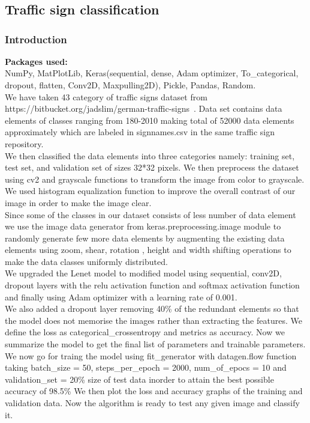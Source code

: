 \chapter{}
\section{{Traffic sign classification}}
\subsection{Introduction}
{\textbf{Packages used:}}\\
NumPy, MatPlotLib, Keras(sequential, dense, Adam optimizer, To\_categorical,\\ dropout, flatten, Conv2D, Maxpulling2D), Pickle, Pandas, Random.\\

We have  taken 43 category of traffic signs dataset from https://bitbucket.org/jadslim/german-traffic-signs~\cite{6033395}. Data set contains data elements of classes ranging from 180-2010 making total of 52000 data elements approximately which are labeled in signnames.csv in the same traffic sign repository.\\
We then classified the data elements into three categories namely: training set, test set, and validation set of sizes 32*32 pixels.
We then preprocess the dataset using  cv2 and grayscale functions to transform the image from color to grayscale.\\

We used histogram equalization function to improve the overall contrast of our image in order to make the image clear.\\
Since some of the classes in our dataset consists of less number of data element we use the image data generator from keras.preprocessing.image module to randomly generate few more data elements by augmenting the existing data elements using zoom, shear, rotation , height and width shifting operations to make the data classes uniformly distributed.\\
We upgraded the Lenet model to modified model using sequential, conv2D, dropout layers with the relu activation function and softmax activation function and finally using Adam optimizer with a learning rate of 0.001.\\

We also added a dropout layer removing 40\% of the redundant elements so that the model does not memorise the images rather than extracting the features. We define  the loss as categorical\_crossentropy and metrics as accuracy. Now we summarize the model to get the final list of parameters and trainable parameters.\\
We now go for traing the model using fit\_generator with datagen.flow function taking batch\_size = 50, steps\_per\_epoch = 2000, num\_of\_epocs = 10 and validation\_set = 20\% size of test data inorder to attain the best possible accuracy of 98.5\%
We then plot the loss and accuracy graphs of the training and validation data. Now the algorithm is ready to test any given image and classify it. 

